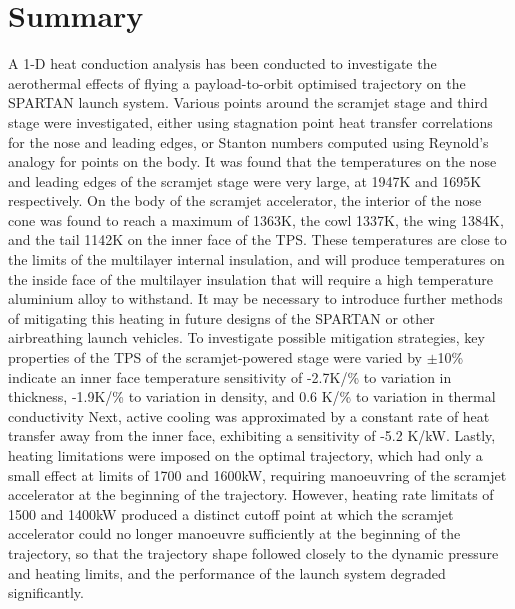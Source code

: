 \section{Summary}

A 1-D heat conduction analysis has been conducted to investigate the aerothermal effects of flying a payload-to-orbit optimised trajectory on the SPARTAN launch system. Various points around the scramjet stage and third stage were investigated, either using stagnation point heat transfer correlations for the nose and leading edges, or Stanton numbers computed using Reynold's analogy for points on the body. It was found that the temperatures on the nose and leading edges of the scramjet stage were very large, at 1947K and 1695K respectively. On the body of the scramjet accelerator, the interior of the nose cone was found to reach a maximum of 1363K, the cowl 1337K, the wing 1384K, and the tail 1142K on the inner face of the TPS. These temperatures are close to the limits of the multilayer internal insulation, and will produce temperatures on the inside face of the multilayer insulation that will require a high temperature aluminium alloy to withstand. It may be necessary to introduce further methods of mitigating this heating in future designs of the SPARTAN or other airbreathing launch vehicles. To investigate possible mitigation strategies, key properties of the TPS of the scramjet-powered stage were varied by $\pm$10\% indicate an inner face temperature sensitivity of -2.7K/\% to variation in thickness, -1.9K/\% to variation in density, and 0.6 K/\% to variation in thermal conductivity 
Next, active cooling was approximated by a constant rate of heat transfer away from the inner face, exhibiting a sensitivity of -5.2 K/kW. Lastly, heating limitations were imposed on the optimal trajectory, which had only a small effect at limits of 1700 and 1600kW, requiring manoeuvring of the scramjet accelerator at the beginning of the trajectory. However, heating rate limitats of 1500 and 1400kW produced a distinct cutoff point at which the scramjet accelerator could no longer manoeuvre sufficiently at the beginning of the trajectory, so that the trajectory shape followed closely to the dynamic pressure and heating limits, and the performance of the launch system degraded significantly. 


